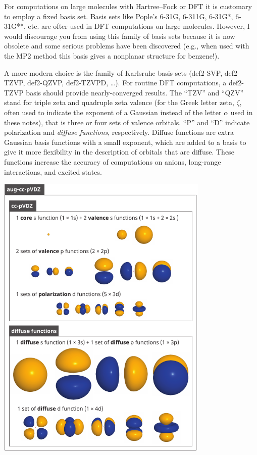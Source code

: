 \documentclass[../Main/notes.tex]{subfiles}
\begin{document}
For computations on large molecules with Hartree--Fock or DFT it is customary to employ a fixed basis set.
Basis sets like Pople's 6-31G, 6-311G, 6-31G*, 6-31G**, etc. are ofter used in DFT computations on large molecules.
However, I would discourage you from using this family of basis sets because it is now obsolete and some serious problems have been discovered (e.g., when used with the MP2 method this basis gives a nonplanar structure for benzene!).

A more modern choice is the family of Karlsruhe basis sets (def2-SVP, def2-TZVP, def2-QZVP, def2-TZVPD, \ldots). For routine DFT computations, a def2-TZVP basis should provide nearly-converged results.
The ``TZV'' and ``QZV'' stand for triple zeta and quadruple zeta valence (for the Greek letter zeta, $\zeta$, often used to indicate the exponent of a Gaussian instead of the letter $\alpha$ used in these notes), that is three or four sets of valence orbitals.
``P'' and ``D'' indicate polarization and \emph{diffuse functions}, respectively.
Diffuse functions are extra Gaussian basis functions with a small exponent, which are added to a basis to give it more flexibility in the description of orbitals that are diffuse.
These functions increase the accuracy of computations on anions, long-range interactions, and excited states.

{
\includegraphics[width=4.00in]{img/cc-basis.pdf}
\label{fig:basis:cc-basis}
}
\end{document}

